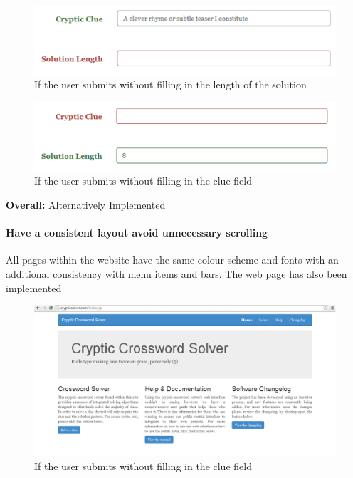 \begin{figure}[H]
	\centering
	\includegraphics[keepaspectratio=true]{evidence/alert2.png}
	\caption{If the user submits without filling in the length of the solution}
\end{figure}

\begin{figure}[H]
	\centering
	\includegraphics[keepaspectratio=true]{evidence/alert3.png}
	\caption{If the user submits without filling in the clue field}
\end{figure}

{\bf Overall:} Alternatively Implemented

\paragraph{Have a consistent layout avoid unnecessary scrolling}
    All pages within the website have the same colour scheme and fonts 
with an additional consistency with menu items and bars. The web page 
has also been implemented 

\begin{figure}[H]
	\centering
	\includegraphics[keepaspectratio=true,scale=0.4]{evidence/scrolling.png}
	\caption{If the user submits without filling in the clue field}
\end{figure}

